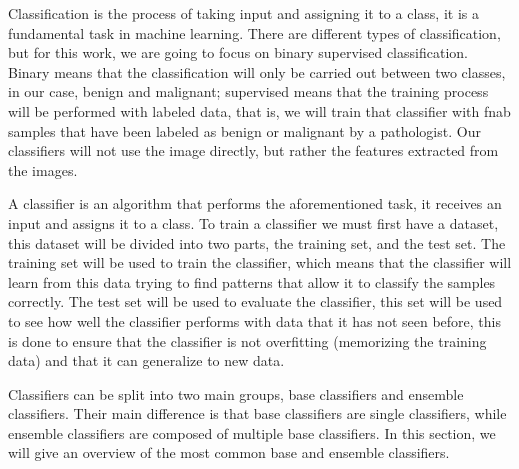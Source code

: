 
Classification is the process of taking input and assigning it to a class, it is a fundamental task in machine learning. There are different types of classification, but for this work, we are going to focus on binary supervised classification. Binary means that the classification will only be carried out between two classes, in our case, benign and malignant; supervised means that the training process will be performed with labeled data, that is, we will train that classifier with \ac{fnab} samples that have been labeled as benign or malignant by a pathologist. Our classifiers will not use the image directly, but rather the features extracted from the images.

A classifier is an algorithm that performs the aforementioned task, it receives an input and assigns it to a class. To train a classifier we must first have a dataset, this dataset will be divided into two parts, the training set, and the test set. The training set will be used to train the classifier, which means that the classifier will learn from this data trying to find patterns that allow it to classify the samples correctly. The test set will be used to evaluate the classifier, this set will be used to see how well the classifier performs with data that it has not seen before, this is done to ensure that the classifier is not overfitting (memorizing the training data) and that it can generalize to new data.

Classifiers can be split into two main groups, base classifiers and ensemble classifiers. Their main difference is that base classifiers are single classifiers, while ensemble classifiers are composed of multiple base classifiers. In this section, we will give an overview of the most common base and ensemble classifiers.




